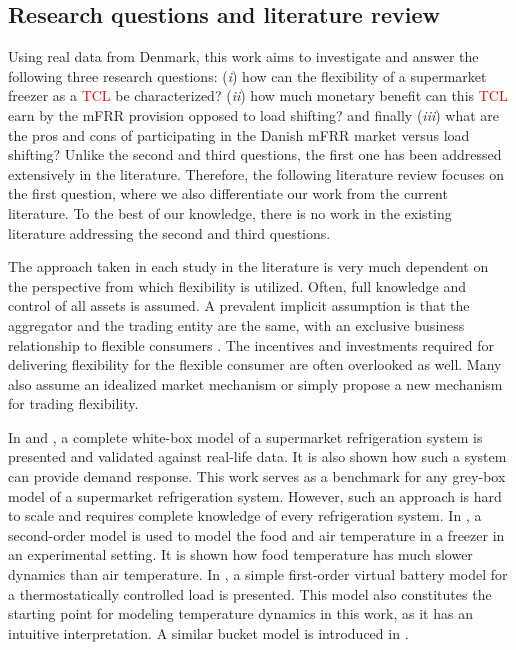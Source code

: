\documentclass[11pt,a4paper]{article}
\begin{document}
\subsection{Research questions and literature review}
%
Using real data from Denmark, this work aims to investigate and answer the following three research questions: (\textit{i}) how can the flexibility of a supermarket freezer as a \textcolor{red}{TCL} be characterized?
(\textit{ii}) how much monetary benefit can this \textcolor{red}{TCL} earn by the mFRR provision opposed to load shifting? and finally (\textit{iii})
what are the pros and cons of participating in the Danish mFRR market versus load shifting? Unlike the second and third questions, the first one has been addressed extensively in the literature. Therefore, the following literature review focuses on the first question, where we also differentiate our work from the current literature. To the best of our knowledge, there is no  work in the existing literature addressing the second and third questions.  





The approach taken in each study in the literature is very much dependent on the perspective from which flexibility is utilized. Often, full knowledge and control of all assets is assumed. A prevalent implicit assumption is that the aggregator and the trading entity are the same, with an exclusive business relationship to flexible consumers \cite{gade2022ecosystem}. The incentives and investments required for delivering flexibility for the flexible consumer are often overlooked as well. Many also assume an idealized market mechanism or simply propose a new mechanism for trading flexibility.

In \cite{petersen2012eso2} and \cite{pedersen2013direct}, a complete white-box model of a supermarket refrigeration system is presented and validated against real-life data. It is also shown how such a system can provide demand response. This work serves as a  benchmark for any grey-box model of a supermarket refrigeration system. However, such an approach is hard to scale and requires complete knowledge of every refrigeration system. In \cite{pedersen2016improving}, a second-order model is used to model the food and air temperature in a freezer in an experimental setting. It is shown how food temperature has much slower dynamics than air temperature. In \cite{hao2014aggregate}, a simple first-order virtual battery model for a thermostatically controlled load is presented. This model also constitutes the starting point for modeling temperature dynamics in this work, as it has an intuitive interpretation. A similar bucket model is introduced in \cite{petersen2013taxonomy}.
\end{document}

